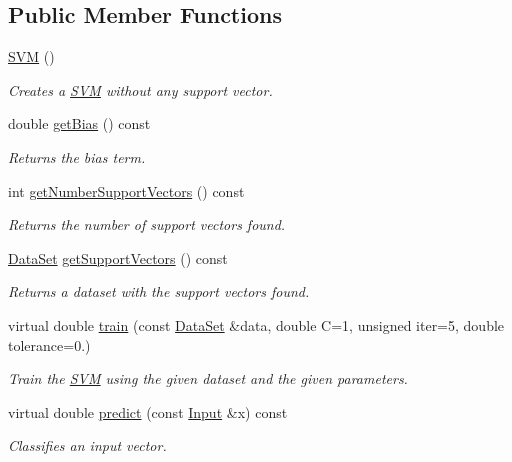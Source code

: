 \subsection*{Public Member Functions}
\begin{DoxyCompactItemize}
\item 
\hyperlink{classhappyml_1_1SVM_a5507aedca56418aeb63abb0d18b1f133}{S\+VM} ()
\begin{DoxyCompactList}\small\item\em Creates a \hyperlink{classhappyml_1_1SVM}{S\+VM} without any support vector. \end{DoxyCompactList}\item 
double \hyperlink{classhappyml_1_1SVM_a9fce220acd57223df101009175dee53a}{get\+Bias} () const 
\begin{DoxyCompactList}\small\item\em Returns the bias term. \end{DoxyCompactList}\item 
int \hyperlink{classhappyml_1_1SVM_a4cc4569eb44c66c9a3a613042140319c}{get\+Number\+Support\+Vectors} () const 
\begin{DoxyCompactList}\small\item\em Returns the number of support vectors found. \end{DoxyCompactList}\item 
\hyperlink{classhappyml_1_1DataSet}{Data\+Set} \hyperlink{classhappyml_1_1SVM_a99e11b69c3b6583eb144ec1cd1f88000}{get\+Support\+Vectors} () const 
\begin{DoxyCompactList}\small\item\em Returns a dataset with the support vectors found. \end{DoxyCompactList}\item 
virtual double \hyperlink{classhappyml_1_1SVM_ac5d83933da1fdf70f1d20995136cfddd}{train} (const \hyperlink{classhappyml_1_1DataSet}{Data\+Set} \&data, double C=1, unsigned iter=5, double tolerance=0.)
\begin{DoxyCompactList}\small\item\em Train the \hyperlink{classhappyml_1_1SVM}{S\+VM} using the given dataset and the given parameters. \end{DoxyCompactList}\item 
virtual double \hyperlink{classhappyml_1_1SVM_af29c307be8f6457806851f7274fc7c50}{predict} (const \hyperlink{namespacehappyml_a03602d1ec49393790b8a0449f40cd01f}{Input} \&x) const 
\begin{DoxyCompactList}\small\item\em Classifies an input vector. \end{DoxyCompactList}\item 

\end{DoxyCompactItemize}
